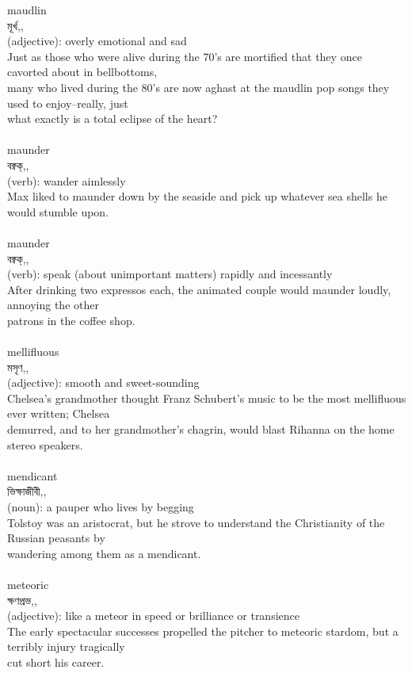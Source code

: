 \documentclass{article}
\begin{document}
{{maudlin}\\
{মূর্খ,,}\\
{(adjective): overly emotional and sad\\Just as those who were alive during the 70's are mortified that they once cavorted about in bellbottoms,\\many who lived during the 80's are now aghast at the maudlin pop songs they used to enjoy--really, just\\what exactly is a total eclipse of the heart?\\}\\
{maunder}\\
{বক্বক্,,}\\
{(verb): wander aimlessly\\Max liked to maunder down by the seaside and pick up whatever sea shells he would stumble upon.\\}\\
{maunder}\\
{বক্বক্,,}\\
{(verb): speak (about unimportant matters) rapidly and incessantly\\After drinking two expressos each, the animated couple would maunder loudly, annoying the other\\patrons in the coffee shop.\\}\\
{mellifluous}\\
{মসৃণ,,}\\
{(adjective): smooth and sweet-sounding\\Chelsea's grandmother thought Franz Schubert's music to be the most mellifluous ever written; Chelsea\\demurred, and to her grandmother's chagrin, would blast Rihanna on the home stereo speakers.\\}\\
{mendicant}\\
{ভিক্ষাজীবী,,}\\
{(noun): a pauper who lives by begging\\Tolstoy was an aristocrat, but he strove to understand the Christianity of the Russian peasants by\\wandering among them as a mendicant.\\}\\
{meteoric}\\
{ক্ষণপ্রভ,,}\\
{(adjective): like a meteor in speed or brilliance or transience\\The early spectacular successes propelled the pitcher to meteoric stardom, but a terribly injury tragically\\cut short his career.\\}\\
}
\end{document}
